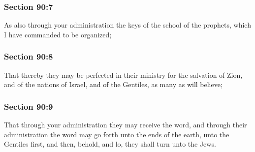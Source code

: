 	\subsubsection{Section 90:7} %
		\label{DC90-7}

		As also through your administration the keys of the school of the prophets, which I have commanded to be organized;


	\subsubsection{Section 90:8} %
		\label{DC90-8}

		That thereby they may be perfected in their ministry for the salvation of Zion, and of the nations of Israel, and of the Gentiles, as many as will believe;


	\subsubsection{Section 90:9} %
		\label{DC90-9}

		That through your administration they may receive the word, and through their administration the word may go forth unto the ends of the earth, unto the Gentiles first, and then, behold, and lo, they shall turn unto the Jews.


